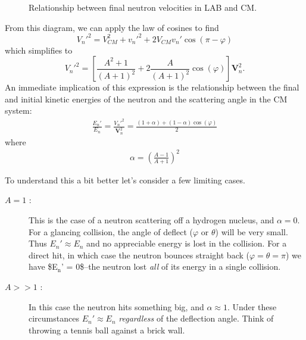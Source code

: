 \documentclass[11pt]{article}
\renewcommand\vec{\mathbf}
\begin{document}
\begin{figure}
\centering
{}
\caption{Relationship between final neutron velocities in LAB and CM.}
\label{fig::scatteringVelLABvsCM}
\end{figure}

From this diagram, we can apply the law of cosines to find
\begin{equation}
  V_n'^2 = V_{CM}^2 + v_n'^2 + 2 V_{CM}v_n'\cos(\pi-\varphi)
\end{equation}
which simplifies to
\begin{equation}
  V_n'^2 = \left[ \frac{A^2+1}{(A+1)^2} + 2 \frac{A}{(A+1)^2}\cos(\varphi) \right] \vec{V}_n^2.
\end{equation}
An immediate implication of this expression is the relationship between the final and initial kinetic energies of the neutron and the scattering angle in the CM system:
\begin{align}
  \frac{E_n'}{E_n} = \frac{V_n'^2}{\vec{V}_n^2}
                   = \frac{(1+\alpha) + (1-\alpha) \cos(\varphi)}{2}
\end{align}
where
\begin{align}
  \alpha = \left( \frac{A-1}{A+1} \right)^2
\end{align}

To understand this a bit better let's consider a few limiting cases.
\begin{description}
\item[{\(A=1\) :}] This is the case of a neutron scattering off a hydrogen nucleus, and \(\alpha = 0\).  For a glancing collision, the angle of deflect (\(\varphi\) or \(\theta\)) will be very small.  Thus \(E_n' \approx E_n\) and no appreciable energy is lost in the collision.  For a direct hit, in which case the neutron bounces straight back (\(\varphi = \theta = \pi\)) we have \$E\(_{\text{n}}\)' = 0\$--the neutron lost \emph{all} of its energy in a single collision.
\item[{\(A>>1\) :}] In this case the neutron hits something big, and \(\alpha \approx 1\).  Under these circumstances \(E_n' \approx E_n\) \emph{regardless} of the deflection angle.  Think of throwing a tennis ball against a brick wall.
\end{description}
\end{document}
